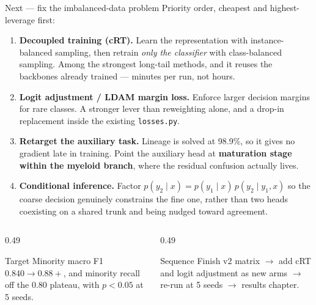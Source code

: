 \documentclass[aspectratio=169,11pt]{beamer}
\begin{document}
\begin{frame}{Next --- fix the imbalanced-data problem}
  \footnotesize
  Priority order, cheapest and highest-leverage first:

  \smallskip
  \begin{enumerate}\setlength{\itemsep}{0.25em}
    \item \textbf{Decoupled training (cRT).} Learn the representation with
      instance-balanced sampling, then retrain \emph{only the classifier} with
      class-balanced sampling. Among the strongest long-tail methods, and it
      reuses the backbones already trained --- minutes per run, not hours.
    \item \textbf{Logit adjustment / LDAM margin loss.} Enforce larger decision
      margins for rare classes. A stronger lever than reweighting alone, and a
      drop-in replacement inside the existing \texttt{losses.py}.
    \item \textbf{Retarget the auxiliary task.} Lineage is solved at 98.9\%, so
      it gives no gradient late in training. Point the auxiliary head at
      \textbf{maturation stage within the myeloid branch}, where the residual
      confusion actually lives.
    \item \textbf{Conditional inference.} Factor
      $p(y_2 \mid x) = p(y_1 \mid x)\, p(y_2 \mid y_1, x)$ so the coarse decision
      genuinely constrains the fine one, rather than two heads coexisting on a
      shared trunk and being nudged toward agreement.
  \end{enumerate}

  \vspace{0.3em}
  \begin{columns}[T]
    \begin{column}{0.49\textwidth}
      \begin{exampleblock}{Target}
        \scriptsize
        Minority macro F1 $0.840 \rightarrow 0.88+$, and minority recall off the
        $0.80$ plateau, with $p < 0.05$ at 5 seeds.
      \end{exampleblock}
    \end{column}
    \begin{column}{0.49\textwidth}
      \begin{block}{Sequence}
        \scriptsize
        Finish v2 matrix $\rightarrow$ add cRT and logit adjustment as new arms
        $\rightarrow$ re-run at 5 seeds $\rightarrow$ results chapter.
      \end{block}
    \end{column}
  \end{columns}
\end{frame}
\end{document}
